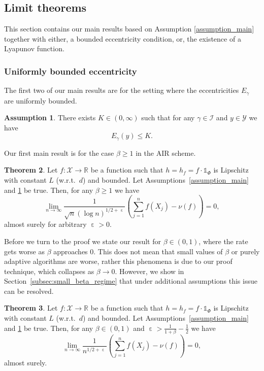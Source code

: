 \documentclass[12pt]{article}
\theoremstyle{definition}
\newtheorem{thm}{Theorem}[section]
\newtheorem{ass}[thm]{Assumption}
\newcommand{\R}{\mathbb{R}}
\newcommand{\cX}{\mathcal{X}}
\newcommand{\cY}{\mathcal{Y}}
\DeclareMathOperator{\eps}{\varepsilon}
\begin{document}
\subsection{Limit theorems}
This section contains our main results based on Assumption \ref{assumption_main} together with either, a bounded eccentricity condition, or, the existence of a Lyapunov function.

\subsubsection{Uniformly bounded eccentricity}\label{subsec:bounded_eccentricity}
The first two of our main results are for the setting where the eccentricities $E_\gamma$ are uniformly bounded.

\begin{ass}\label{ass:bounded_eccentricity}
	There exists $K \in (0, \infty) $ such that for any $\gamma \in \mathcal{I}$ and $y \in \cY$ we have 
	\[
	E_\gamma (y) \leq K.
	\]
\end{ass}


Our first main result is for the case $\beta\geq 1$ in the AIR scheme. 


\begin{thm}\label{thm:limit_result_bounded_eccentricity_large_beta}
	Let $f \colon \cX \to \R$ be a function such that $h = h_f = f \cdot \mathds{1}_\Phi$ is Lipschitz with constant $L$ (w.r.t.~$d$) and bounded. 
	Let Assumptions~\ref{assumption_main} and \ref{ass:bounded_eccentricity} be true. 
	Then, for any $\beta\geq 1$ we have 
	\[
	\lim_{n \to \infty} \frac{1}{\sqrt{n} (\log n)^{1/2+\eps}} \left( \sum_{j=1}^n f(X_j) - \nu(f)\right) =0, 
	\]
	almost surely for arbitrary $\eps>0$. 
\end{thm}

Before we turn to the proof we state our result for $\beta \in (0,1)$, where the rate gets worse as $\beta $ approaches $0$.
This does not mean that small values of $\beta$ or purely adaptive algorithms are worse, rather this phenomena is due to our proof technique, which collapses as $\beta \to 0$. 
{However, we show in Section~\ref{subsec:small_beta_regime} that under additional assumptions this issue can be resolved.}

\begin{thm}\label{thm:limit_result_bounded_eccentricity_small_beta}
	Let $f \colon \cX \to \R$ be a function such that $h = h_f = f \cdot \mathds{1}_\Phi$ is Lipschitz with constant $L$ (w.r.t.~$d$) and bounded. 
	Let Assumptions~\ref{assumption_main} and \ref{ass:bounded_eccentricity} be true. 
	Then, for any $\beta \in (0,1)$ and $\eps > \frac{1}{1+\beta} - \frac{1}{2}$ we have 
	\[
	\lim_{n \to \infty} \frac{1}{n^{1/2+\eps}} \left( \sum_{j=1}^n f(X_j) - \nu(f)\right) =0, 
	\]
	almost surely. 
\end{thm}
\end{document}
